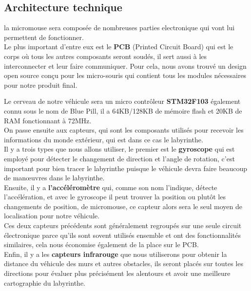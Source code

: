 \subsection{Architecture technique} \label{subsec:archTechnique}

   la micromouse sera composée de nombreuses parties electronique qui vont lui
permettent de fonctionner. \\


   Le plus important d'entre eux est le \textbf{PCB} (Printed Circuit Board)
qui est le corps où tous les autres composants seront soudés, il sert aussi
à les interconnecter et  leur faire communiquer. Pour cela, nous avons
trouvé un design open source \cite{Bulebule:1} conçu pour les micro-souris
qui contient tous les modules nécessaires pour notre produit final. \\




   Le cerveau de notre véhicule sera un micro contrôleur \textbf{STM32F103}
également connu sous le nom de Blue Pill, il a 64KB/128KB de mémoire flash
et 20KB de RAM fonctionnant à 72MHz. \\


   On passe ensuite aux capteurs, qui sont les composants utilisés pour
recevoir les informations du monde extérieur, qui est dans ce cas le
labyrinthe. \\


   Il y a trois types que nous allons utiliser, le premier est le
\textbf{gyroscope} qui est employé pour détecter le changement de direction
et l'angle de rotation, c'est important pour bien tracer le labyrinthe
puisque le véhicule devra faire beaucoup de manœuvres dans le labyrinthe. \\


   Ensuite, il y a \textbf{l'accéléromètre} qui, comme son nom l'indique,
détecte l'accélération, et avec le gyroscope il peut trouver la position ou
plutôt les changements de position, de micromouse, ce capteur alors sera le
seul moyen de localisation pour notre véhicule.\\


   Ces deux capteurs précédents sont généralement regroupés sur une seule
circuit électronique parce qu'ils sont sovent utilisés ensemble et ont des
fonctionnalités similaires, cela nous économise également de la place sur le
PCB. \\


   Enfin, il y a les \textbf{capteurs infrarouge} que nous utiliserons pour
obtenir la distance du véhicule des murs et autres obstacles, ils seront
placés sur toutes les directions pour évaluer plus précisément les alentours
et avoir une meilleure cartographie du labyrinthe. \\


